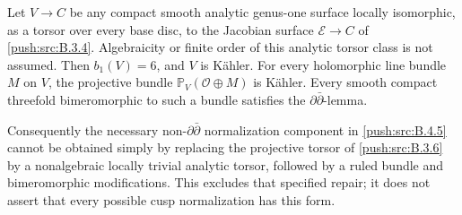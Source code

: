 \begin{proposition}\label{push:src:B.3.8}\label{push:B38}
Let $V\to C$ be any compact smooth analytic genus-one surface
locally isomorphic, as a torsor over every base disc, to the
Jacobian surface $\mathscr E\to C$ of \ref{push:src:B.3.4}. Algebraicity
or finite order of this analytic torsor class is not assumed.
Then $b_1(V)=6$, and $V$ is K\"ahler. For every holomorphic
line bundle $M$ on $V$, the projective bundle
$\mathbb P_V(\mathcal O\oplus M)$ is K\"ahler. Every smooth
compact threefold bimeromorphic to such a bundle satisfies
the $\partial\bar\partial$-lemma.

Consequently the necessary non-$\partial\bar\partial$
normalization component in \ref{push:src:B.4.5} cannot be obtained simply
by replacing the projective torsor of \ref{push:src:B.3.6} by a nonalgebraic
locally trivial analytic torsor, followed by a ruled bundle
and bimeromorphic modifications. This excludes that specified
repair; it does not assert that every possible cusp
normalization has this form.
\end{proposition}

